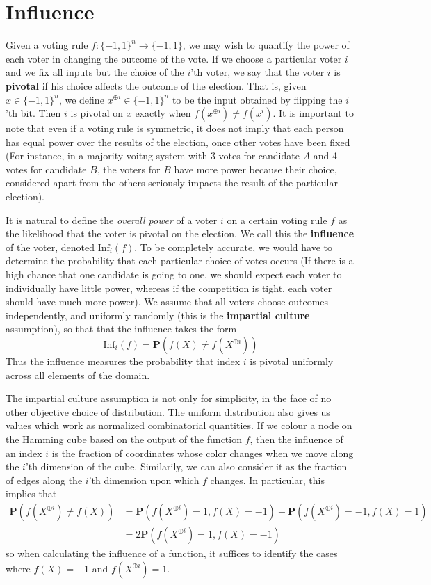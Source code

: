 \section{Influence}

Given a voting rule $f: \{ -1, 1 \}^n \to \{ -1, 1 \}$, we may wish to quantify the power of each voter in changing the outcome of the vote. If we choose a particular voter $i$ and we fix all inputs but the choice of the $i$'th voter, we say that the voter $i$ is {\bf pivotal} if his choice affects the outcome of the election. That is, given $x \in \{ -1, 1 \}^n$, we define $x^{\oplus i} \in \{ -1, 1 \}^n$ to be the input obtained by flipping the $i$'th bit. Then $i$ is pivotal on $x$ exactly when $f(x^{\oplus i}) \neq f(x^i)$. It is important to note that even if a voting rule is symmetric, it does not imply that each person has equal power over the results of the election, once other votes have been fixed (For instance, in a majority voitng system with 3 votes for candidate $A$ and 4 votes for candidate $B$, the voters for $B$ have more power because their choice, considered apart from the others seriously impacts the result of the particular election).

It is natural to define the {\it overall power} of a voter $i$ on a certain voting rule $f$ as the likelihood that the voter is pivotal on the election. We call this the {\bf influence} of the voter, denoted $\text{Inf}_i(f)$. To be completely accurate, we would have to determine the probability that each particular choice of votes occurs (If there is a high chance that one candidate is going to one, we should expect each voter to individually have little power, whereas if the competition is tight, each voter should have much more power). We assume that all voters choose outcomes independently, and uniformly randomly (this is the {\bf impartial culture} assumption), so that that the influence takes the form
%
\[ \text{Inf}_i(f) = \mathbf{P}(f(X) \neq f(X^{\oplus i})) \]
%
Thus the influence measures the probability that index $i$ is pivotal uniformly across all elements of the domain.

The impartial culture assumption is not only for simplicity, in the face of no other objective choice of distribution. The uniform distribution also gives us values which work as normalized combinatorial quantities. If we colour a node on the Hamming cube based on the output of the function $f$, then the influence of an index $i$ is the fraction of coordinates whose color changes when we move along the $i$'th dimension of the cube. Similarily, we can also consider it as the fraction of edges along the $i$'th dimension upon which $f$ changes. In particular, this implies that
%
\begin{align*}
    \mathbf{P}(f(X^{\oplus i}) \neq f(X)) &= \mathbf{P}(f(X^{\oplus i}) = 1, f(X) = -1) + \mathbf{P}(f(X^{\oplus i}) = -1, f(X) = 1)\\
    &= 2 \mathbf{P}(f(X^{\oplus i}) = 1, f(X) = -1)
\end{align*}
%
so when calculating the influence of a function, it suffices to identify the cases where $f(X) = -1$ and $f(X^{\oplus i}) = 1$.

